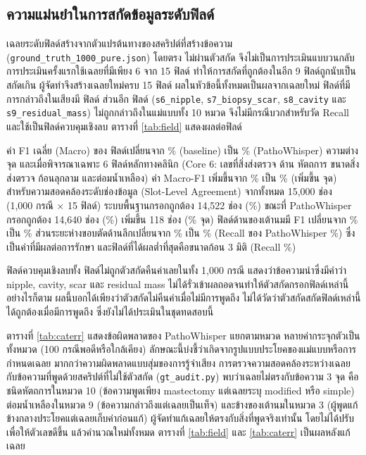\subsection{ความแม่นยำในการสกัดข้อมูลระดับฟิลด์}

เฉลยระดับฟิลด์สร้างจากตัวแปรต้นทางของสคริปต์ที่สร้างข้อความ (\texttt{ground\_truth\_1000\_pure.json}) โดยตรง ไม่ผ่านตัวสกัด จึงไม่เป็นการประเมินแบบวนกลับ การประเมินครั้งแรกใช้เฉลยที่มีเพียง 6 จาก 15 ฟิลด์ ทำให้การสกัดที่ถูกต้องในอีก 9 ฟิลด์ถูกนับเป็นสกัดเกิน ผู้จัดทำจึงสร้างเฉลยใหม่ครบ 15 ฟิลด์ ผลในหัวข้อนี้ทั้งหมดเป็นผลจากเฉลยใหม่ ฟิลด์ที่มีการกล่าวถึงในเสียงมี \nSpoken{} ฟิลด์ ส่วนอีก \nNeg{} ฟิลด์ (\texttt{s6\_nipple}, \texttt{s7\_biopsy\_scar}, \texttt{s8\_cavity} และ \texttt{s9\_residual\_mass}) ไม่ถูกกล่าวถึงในแม่แบบทั้ง 10 หมวด จึงไม่มีกรณีบวกสำหรับวัด Recall และใช้เป็นฟิลด์ควบคุมเชิงลบ ตารางที่ \ref{tab:field} แสดงผลต่อฟิลด์



ค่า F1 เฉลี่ย (Macro) ของ \nSpoken{} ฟิลด์เปลี่ยนจาก \MacroBase\% (baseline) เป็น \MacroPW\% (PathoWhisper) ความต่าง \MacroDelta{} จุด และเมื่อพิจารณาเฉพาะ 6 ฟิลด์หลักทางคลินิก (Core 6: เลขที่สิ่งส่งตรวจ ด้าน หัตถการ ขนาดสิ่งส่งตรวจ ก้อนลุกลาม และต่อมน้ำเหลือง) ค่า Macro-F1 เพิ่มขึ้นจาก \CoreBase\% เป็น \CorePW\% (เพิ่มขึ้น \CoreDelta{} จุด) สำหรับความสอดคล้องระดับช่องข้อมูล (Slot-Level Agreement) จากทั้งหมด 15,000 ช่อง (1,000 กรณี $\times$ 15 ฟิลด์) ระบบพื้นฐานกรอกถูกต้อง 14,522 ช่อง (\SlotBase\%) ขณะที่ PathoWhisper กรอกถูกต้อง 14,640 ช่อง (\SlotPW\%) เพิ่มขึ้น 118 ช่อง (\SlotDelta\% จุด) ฟิลด์ด้านของเต้านมมี F1 เปลี่ยนจาก \FBaseSide\% เป็น \FPWSide\% ส่วนระยะห่างขอบตัดด้านลึกเปลี่ยนจาก \FBaseDeepMargin\% เป็น \FPWDeepMargin\% (Recall ของ PathoWhisper \RPWDeepMargin\%) ซึ่งเป็นค่าที่มีผลต่อการรักษา และฟิลด์ที่ได้ผลต่ำที่สุดคือขนาดก้อน 3 มิติ (Recall \RPWMassDims\%)

ฟิลด์ควบคุมเชิงลบทั้ง \nNeg{} ฟิลด์ไม่ถูกตัวสกัดคืนค่าเลยในทั้ง 1,000 กรณี แสดงว่าข้อความนำซึ่งมีคำว่า nipple, cavity, scar และ residual mass ไม่ได้รั่วเข้าผลถอดจนทำให้ตัวสกัดกรอกฟิลด์เหล่านี้ อย่างไรก็ตาม ผลนี้บอกได้เพียงว่าตัวสกัดไม่คืนค่าเมื่อไม่มีการพูดถึง ไม่ได้วัดว่าตัวสกัดสกัดฟิลด์เหล่านี้ได้ถูกต้องเมื่อมีการพูดถึง ซึ่งยังไม่ได้ประเมินในชุดทดสอบนี้

ตารางที่ \ref{tab:caterr} แสดงข้อผิดพลาดของ PathoWhisper แยกตามหมวด หลายค่ากระจุกตัวเป็นทั้งหมวด (100 กรณีพอดีหรือใกล้เคียง) ลักษณะนี้บ่งชี้ว่าเกิดจากรูปแบบประโยคของแม่แบบหรือการกำหนดเฉลย มากกว่าความผิดพลาดแบบสุ่มของการรู้จำเสียง การตรวจความสอดคล้องระหว่างเฉลยกับข้อความที่พูดด้วยสคริปต์ที่ไม่ใช้ตัวสกัด (\texttt{gt\_audit.py}) พบว่าเฉลยไม่ตรงกับข้อความ 3 จุด คือ ชนิดหัตถการในหมวด 10 (ข้อความพูดเพียง mastectomy แต่เฉลยระบุ modified หรือ simple) ต่อมน้ำเหลืองในหมวด 9 (ข้อความกล่าวถึงแต่เฉลยเป็นเท็จ) และข้างของเต้านมในหมวด 3 (ผู้พูดแก้ข้างกลางประโยคแต่เฉลยเก็บค่าก่อนแก้) ผู้จัดทำแก้เฉลยให้ตรงกับสิ่งที่พูดจริงเท่านั้น โดยไม่ได้ปรับเพื่อให้ตัวเลขดีขึ้น แล้วคำนวณใหม่ทั้งหมด ตารางที่ \ref{tab:field} และ \ref{tab:caterr} เป็นผลหลังแก้เฉลย

